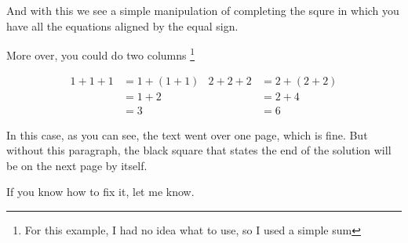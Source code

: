 \begin{solution}
And with this we see a simple manipulation of completing the squre in which you have all the equations aligned by the equal sign.

More over, you could do two columns
\footnote{For this example, I had no idea what to use, so I used a simple sum}

\begin{align*}
    1 + 1 + 1 &= 1 + (1 + 1)
    &
    2 + 2+ 2 &= 2 + (2 + 2) \\
    &= 1 + 2
    &
    &= 2 + 4 \\
    &= 3 
    &
    &=6
\end{align*}

In this case, as you can see, the text went over one page, which is fine. But without this paragraph, the black square that states the end of the solution will be on the next page by itself.

If you know how to fix it, let me know.

\end{solution}
